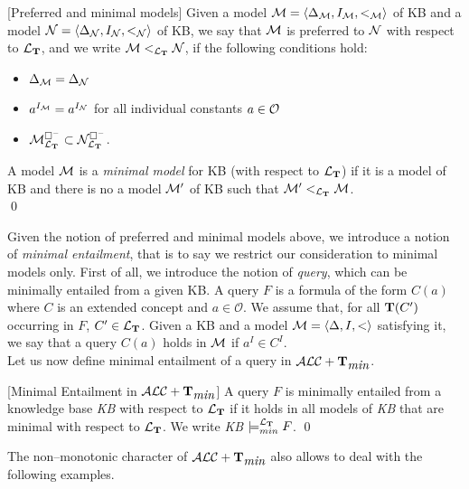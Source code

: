 \documentclass[a4paper, 11pt, oneside]{duthesis}
\newcommand{\tip}{{\bf T}}
\newcommand{\alctmin}{\mathcal{ALC}+\tip_{\mbox{\em min}}}
\newcommand{\bbox}{\square}
\newcommand{\sx} {\langle}
\newcommand{\dx} {\rangle}
\newcommand{\ellet} {\mathcal{L}_{\bf T}}
\newcommand{\emme} {\begin{mathcal}M\end{mathcal}}
\newcommand{\enne} {\begin{mathcal}N\end{mathcal}}
\newenvironment{definition}
{\begin{defi} \rm}{\qed \end{defi}}
\newenvironment{definition}
{\begin{defi} \rm}{\qed \end{defi}}
\newtheorem{definition}{Definition}
\newcounter{posu}
\newtheorem{definition}[posu]{Definition}
\begin{document}
\begin{definition}[Preferred and minimal models]\label{def preferred and minimal models}
Given a model $\emme=\sx \Delta_{\emme}, I_{\emme}, <_{\emme} \dx$ of KB and  a model $\enne=\sx \Delta_{\enne}, I_{\enne}, <_{\enne} \dx$ of KB, we say that $\emme$ is preferred to $\enne$ with respect to ${\ellet}$, and we write $\emme <_{\ellet} \enne$, if the following conditions hold:

\begin{itemize}
\item $\Delta_{\emme}=\Delta_{\enne}$
\item $a^{I_{\emme}}=a^{I_{\enne}}$ for all individual constants $a \in \begin{mathcal}O\end{mathcal}$
\item $\emme^{\bbox^-}_{\ellet} \subset \enne^{\bbox^-}_{\ellet}$.
\end{itemize}

\noindent A model $\emme$ is a \emph{minimal model} for KB (with respect to ${\ellet}$) if it is a model of KB and there is no a model $\emme'$ of KB such that $\emme' <_{\ellet} \emme$.\\
\end{definition}

\noindent Given the notion of preferred and minimal models above, we introduce a notion of \emph{minimal entailment}, that is to say we restrict our consideration to minimal models only.
First of all, we introduce the notion of \emph{query}, which can be minimally entailed from a given KB.
A query $F$ is  a formula of the form $C(a)$ where $C$ is an extended concept and $a \in \mathcal{O}$.
We assume that, for all $\tip(C')$ occurring in $F$, $C' \in \ellet$.
Given a KB and a model $\emme=\sx \Delta, I, < \dx$ satisfying it, we say that a query $C(a)$ holds in $\emme$ if $a^I \in C^I$.\\

Let us now define minimal entailment of a query in $\alctmin$.

\begin{definition}[Minimal Entailment in $\alctmin$]\label{LogicalConsequenceALCTMIN}
A query $F$  is minimally entailed from a knowledge base \emph{KB} with respect to ${\ellet}$ if it holds in all models of \emph{KB} that are minimal with respect to ${\ellet}$.
We write \emph{KB} $\models_{min}^{\ellet} F$.
\end{definition}


\noindent The non--monotonic character of $\alctmin$ also allows to deal with the following examples.
\end{document}
